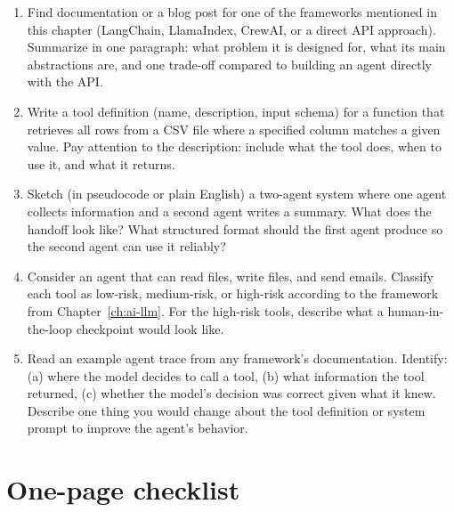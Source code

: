 \begin{enumerate}[noitemsep,topsep=0pt]
  \item Find documentation or a blog post for one of the frameworks mentioned in this chapter (LangChain, LlamaIndex, CrewAI, or a direct API approach). Summarize in one paragraph: what problem it is designed for, what its main abstractions are, and one trade-off compared to building an agent directly with the API.
  \item Write a tool definition (name, description, input schema) for a function that retrieves all rows from a CSV file where a specified column matches a given value. Pay attention to the description: include what the tool does, when to use it, and what it returns.
  \item Sketch (in pseudocode or plain English) a two-agent system where one agent collects information and a second agent writes a summary. What does the handoff look like? What structured format should the first agent produce so the second agent can use it reliably?
  \item Consider an agent that can read files, write files, and send emails. Classify each tool as low-risk, medium-risk, or high-risk according to the framework from Chapter~\ref{ch:ai-llm}. For the high-risk tools, describe what a human-in-the-loop checkpoint would look like.
  \item Read an example agent trace from any framework's documentation. Identify: (a) where the model decides to call a tool, (b) what information the tool returned, (c) whether the model's decision was correct given what it knew. Describe one thing you would change about the tool definition or system prompt to improve the agent's behavior.
\end{enumerate}

\section{One-page checklist}

